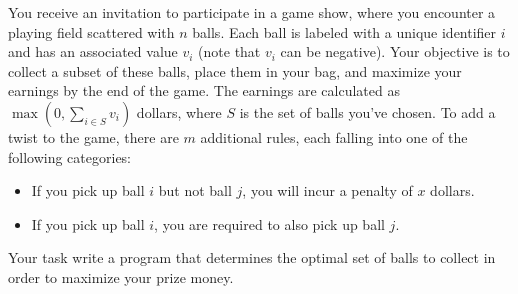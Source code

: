 You receive an invitation to participate in a game show, where you encounter a playing field scattered with $n$ balls. Each ball is labeled with a unique identifier $i$ and has an associated value $v_i$ (note that $v_i$ can be negative). Your objective is to collect a subset of these balls, place them in your bag, and maximize your earnings by the end of the game. The earnings are calculated as $\max(0, \sum_{i \in S} v_i)$ dollars, where $S$ is the set of balls you've chosen. To add a twist to the game, there are $m$ additional rules, each falling into one of the following categories:
\begin{itemize}
    \item If you pick up ball $i$ but not ball $j$, you will incur a penalty of $x$ dollars.
    \item If you pick up ball $i$, you are required to also pick up ball $j$.
\end{itemize}
Your task write a program that determines the optimal set of balls to collect in order to maximize your prize money.
